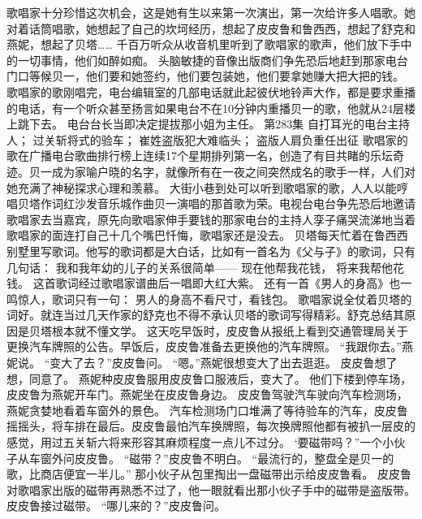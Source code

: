 \documentclass[a4paper,12pt,UTF8,twoside]{ctexbook}
\begin{document}
        歌唱家十分珍惜这次机会，这是她有生以来第一次演出，第一次给许多人唱歌。她对着话筒唱歌，她想起了自己的坎坷经历，想起了皮皮鲁和鲁西西，想起了舒克和燕妮，想起了贝塔……  
        千百万听众从收音机里听到了歌唱家的歌声，他们放下手中的一切事情，他们如醉如痴。  
        头脑敏捷的音像出版商们争先恐后地赶到那家电台门口等候贝一，他们要和她签约，他们要包装她，他们要拿她赚大把大把的钱。  
        歌唱家的歌刚唱完，电台编辑室的几部电话就此起彼伏地铃声大作，都是要求重播的电话，有一个听众甚至扬言如果电台不在10分钟内重播贝一的歌，他就从24层楼上跳下去。  
        电台台长当即决定提拔那小姐为主任。          第283集  
        自打耳光的电台主持人；  
        过关斩将式的验车；  
        崔姓盗版犯大难临头；  
        盗版人肩负重任出征    
        歌唱家的歌在广播电台歌曲排行榜上连续17个星期排列第一名，创造了有目共睹的乐坛奇迹。贝一成为家喻户晓的名字，就像所有在一夜之间突然成名的歌手一样，人们对她充满了神秘探求心理和羡慕。  
        大街小巷到处可以听到歌唱家的歌，人人以能哼唱贝塔作词红沙发音乐城作曲贝一演唱的那首歌为荣。电视台电台争先恐后地邀请歌唱家去当嘉宾，原先向歌唱家伸手要钱的那家电台的主持人孪子痛哭流涕地当着歌唱家的面连打自己十几个嘴巴忏悔，歌唱家还是没去。        
        贝塔每天忙着在鲁西西别墅里写歌词。他写的歌词都是大白话，比如有一首名为《父与子》的歌词，只有几句话：  
        我和我年幼的儿子的关系很简单——  
        现在他帮我花钱，  
        将来我帮他花钱。  
        这首歌词经过歌唱家谱曲后一唱即大红大紫。  
        还有一首《男人的身高》也一鸣惊人，歌词只有一句：  
        男人的身高不看尺寸，看钱包。  
        歌唱家说全仗着贝塔的词好。就连当过几天作家的舒克也不得不承认贝塔的歌词写得精彩。舒克总结其原因是贝塔根本就不懂文学。  
        这天吃早饭时，皮皮鲁从报纸上看到交通管理局关于更换汽车牌照的公告。早饭后，皮皮鲁准备去更换他的汽车牌照。  
        “我跟你去。”燕妮说。  
        “变大了去？”皮皮鲁问。  
        “嗯。”燕妮很想变大了出去逛逛。  
        皮皮鲁想了想，同意了。  
        燕妮种皮皮鲁服用皮皮鲁口服液后，变大了。  
        他们下楼到停车场，皮皮鲁为燕妮开车门。燕妮坐在皮皮鲁身边。  
        皮皮鲁驾驶汽车驶向汽车检测场，燕妮贪婪地看着车窗外的景色。  
        汽车检测场门口堆满了等待验车的汽车，皮皮鲁摇摇头，将车排在最后。皮皮鲁最怕汽车换牌照，每次换牌照他都有被扒一层皮的感觉，用过五关斩六将来形容其麻烦程度一点儿不过分。  
        ‘要磁带吗？”一个小伙子从车窗外问皮皮鲁。  
        “磁带？”皮皮鲁不明白。  
        “最流行的，整盘全是贝一的歌，比商店便宜一半儿。”  
        那小伙子从包里掏出一盘磁带出示给皮皮鲁看。  
        皮皮鲁对歌唱家出版的磁带再熟悉不过了，他一眼就看出那小伙子手中的磁带是盗版带。  
        皮皮鲁接过磁带。  
        “哪儿来的？”皮皮鲁问。  
\end{document}
